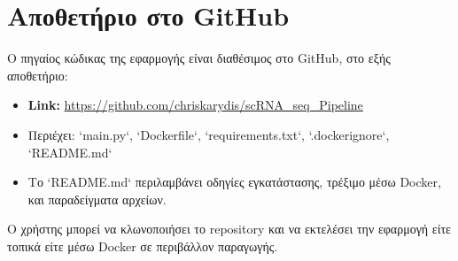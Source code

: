\chapter{Αποθετήριο στο \foreignlanguage{english}{GitHub}}

Ο πηγαίος κώδικας της εφαρμογής είναι διαθέσιμος στο \foreignlanguage{english}{GitHub}, στο εξής αποθετήριο:

\begin{itemize}
  \item \foreignlanguage{english}{\textbf{Link:} \url{https://github.com/chriskarydis/scRNA_seq_Pipeline}}
  \item Περιέχει: \foreignlanguage{english}{`main.py`, `Dockerfile`, `requirements.txt`, `.dockerignore`, `README.md`}
  \item Το \foreignlanguage{english}{`README.md`} περιλαμβάνει οδηγίες εγκατάστασης, τρέξιμο μέσω \foreignlanguage{english}{Docker}, και παραδείγματα αρχείων.
\end{itemize}

Ο χρήστης μπορεί να κλωνοποιήσει το \foreignlanguage{english}{repository} και να εκτελέσει την εφαρμογή είτε τοπικά είτε μέσω \foreignlanguage{english}{Docker} σε περιβάλλον παραγωγής.